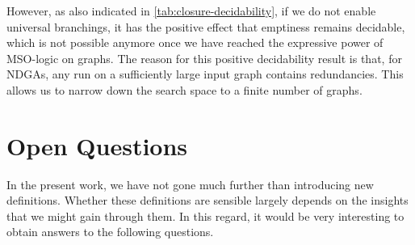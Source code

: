 \documentclass[a4paper,11pt,twoside]{report} \pdfoutput=1
\begin{document}
However, as also indicated in \cref{tab:closure-decidability}, if we
do not enable universal branchings, it has the positive effect that
emptiness remains decidable, which is not possible anymore once we
have reached the expressive power of MSO-logic on graphs. The reason
for this positive decidability result is that, for NDGAs, any run on a
sufficiently large input graph contains redundancies. This allows us
to narrow down the search space to a finite number of graphs.

\section{Open Questions}
In the present work, we have not gone much further than introducing
new definitions. Whether these definitions are sensible largely
depends on the insights that we might gain through them. In this
regard, it would be very interesting to obtain answers to the
following questions.
\end{document}
